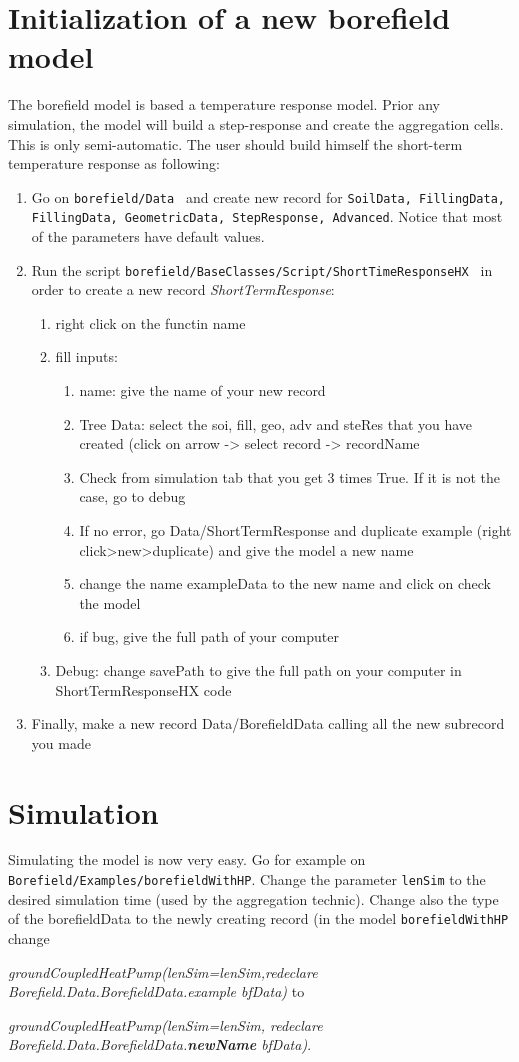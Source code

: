 \documentclass[a4paper,oneside,11pt]{report}
\begin{document}
\section{Initialization of a new borefield model} \label{sec:ini_mod}
The borefield model is based a temperature response model. Prior any simulation, the model will build a step-response and create the aggregation cells. This is only semi-automatic. The user should build himself the short-term temperature response as following:
\begin{enumerate}
\item Go on {\tt borefield/Data } and create new record for {\tt SoilData, FillingData, FillingData, GeometricData, StepResponse, Advanced}. Notice that most of the parameters have default values.
\item Run the script {\tt borefield/BaseClasses/Script/ShortTimeResponseHX } in order to create a new record \textit{ShortTermResponse}:
	\begin{enumerate}
	\item right click on the functin name
	\item fill inputs:
		\begin{enumerate}
		\item name: give the name of your new record
		\item Tree Data: select the soi, fill, geo, adv and steRes that you have created (click on arrow -> select record -> recordName
		\item Check from simulation tab that you get 3 times True. If it is not the case, go to debug
		\item If no error, go Data/ShortTermResponse and duplicate example (right click>new>duplicate) and give the model a new name
		\item change the name exampleData to the new name and click on check the model
		\item if bug, give the full path of your computer
		\end{enumerate}
	\item Debug: change savePath to give the full path on your computer in ShortTermResponseHX code
	\end{enumerate}
\item Finally, make a new record Data/BorefieldData calling all the new subrecord you made
\end{enumerate}

\section{Simulation}
Simulating the model is now very easy. Go for example on {\tt Borefield/Examples/borefieldWithHP}. Change the parameter {\tt lenSim} to the desired simulation time (used by the aggregation technic). Change also the type of the borefieldData to the newly creating record (in the model {\tt borefieldWithHP} change 

\textit{groundCoupledHeatPump(lenSim=lenSim,redeclare Borefield.Data.BorefieldData.example bfData)} to 

\textit{ groundCoupledHeatPump(lenSim=lenSim, redeclare Borefield.Data.BorefieldData.\textbf{newName} bfData)}.
\end{document}
